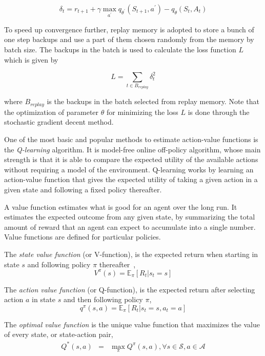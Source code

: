 \begin{equation}
\delta_t = r_{t+1} + \gamma \max_{a^ \prime} q_{\theta^{\prime}}(S_{t+1},a^ \prime) - q_\theta(S_t,A_t)
\end{equation}

To speed up convergence further, replay memory is adopted to store a bunch of one step backups and use a part of them chosen randomly from the memory by batch size. The backups in the batch is used to calculate the loss function $L$ which is given by

\begin{equation}
L = \sum_{t\in B_{replay}}\delta_t^2
\end{equation}

where $B_{replay}$ is the backups in the batch selected from replay memory. Note that the optimization of parameter $\theta$ for minimizing the loss $L$ is done through the stochastic gradient decent method.

One of the most basic and popular methods to estimate action-value functions is the \emph{Q-learning} algorithm. It is model-free online off-policy algorithm, whose main strength is that it is able to compare the expected utility of the available actions without requiring a model of the environment. Q-learning works by learning an action-value function that gives the expected utility of taking a given action in a given state and following a fixed policy thereafter.

A value function estimates what is good for an agent over the long run. It estimates the expected outcome from any given state, by summarizing the total amount of reward that an agent can expect to accumulate into a single number. Value functions are defined for particular policies.

The \emph{state value function} (or V-function), is the expected return when starting in state $s$ and following policy $\pi$ thereafter~\citep{Sutton1998RL},
%
\begin{equation}
V^\pi(s) = \mathbb{E}_\pi \left[R_t | s_t = s \right]
\end{equation}

The \emph{action value function} (or Q-function), is the expected return after selecting action $a$ in state $s$ and then following policy $\pi$,
%
\begin{equation}
q^\pi(s,a) = \mathbb{E}_\pi \left[ R_t | s_t = s, a_t = a \right]
\end{equation}

The \emph{optimal value function} is the unique value function that maximizes the value of every state, or state-action pair,
%
\begin{eqnarray}
Q^*(s,a) & = & \max\limits_\pi Q^\pi(s,a), \forall s \in \mathcal{S}, a \in \mathcal{A}
\end{eqnarray}


